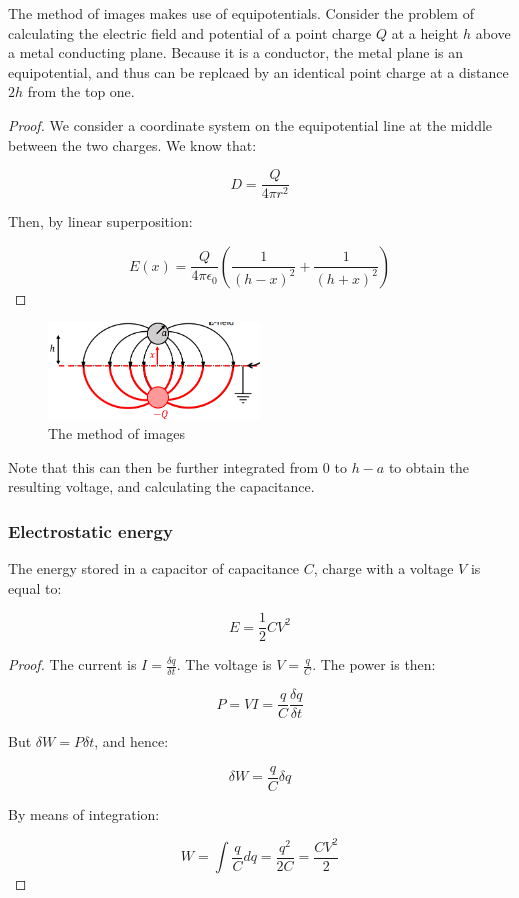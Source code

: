 \documentclass{article}
\begin{document}
\begin{theorem}
    The method of images makes use of equipotentials. Consider the problem of calculating the electric field and potential of a point charge $Q$ at a height $h$ above a metal conducting plane. Because it is a conductor, the metal plane is an equipotential, and thus can be replcaed by an identical point charge at a distance $2h$ from the top one.
\end{theorem}

\begin{proof}
    We consider a coordinate system on the equipotential line at the middle between the two charges. We know that:

    \[ D = \frac{Q}{4\pi r^2} \]

    Then, by linear superposition:

    \[ E(x) = \frac{Q}{4\pi\epsilon_0}\left(\frac{1}{(h-x)^2} + \frac{1}{(h+x)^2}\right) \]
\end{proof}

\begin{figure}[h]
    \centering
    \includegraphics[width = 0.5\textwidth]{images/images.png}
    \caption{The method of images}
    \label{fig:enter-label}
\end{figure}

Note that this can then be further integrated from $0$ to $h - a$ to obtain the resulting voltage, and calculating the capacitance.

\subsubsection{Electrostatic energy}

\begin{proposition}
    The energy stored in a capacitor of capacitance $C$, charge with a voltage $V$ is equal to:

    \[ E = \frac{1}{2}CV^2 \]
\end{proposition}

\begin{proof}
    The current is $I = \frac{\delta q}{\delta t}$. The voltage is $V = \frac{q}{C}$. The power is then:

    \[ P = VI = \frac{q}{C}\frac{\delta q}{\delta t} \]

    But $\delta W = P\delta t$, and hence:

    \[ \delta W = \frac{q}{C}\delta q\]

    By means of integration:

    \[ W = \int \frac{q}{C}dq = \frac{q^2}{2C} = \frac{CV^2}{2} \]
\end{proof}
\end{document}
